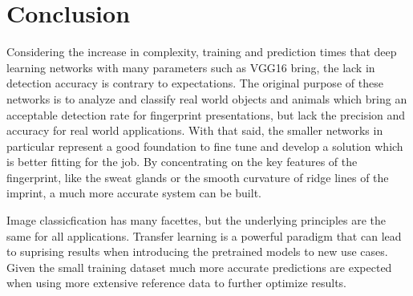 \section{Conclusion}
Considering the increase in complexity, training and prediction times that deep learning networks with many parameters such as VGG16 bring, the lack in detection accuracy is contrary to expectations.
The original purpose of these networks is to analyze and classify real world objects and animals which bring an acceptable detection rate for fingerprint presentations, but lack the precision and accuracy for real world applications.
With that said, the smaller networks in particular represent a good foundation to fine tune and develop a solution which is better fitting for the job.
By concentrating on the key features of the fingerprint, like the sweat glands or the smooth curvature of ridge lines of the imprint, a much more accurate system can be built.

Image classicfication has many facettes, but the underlying principles are the same for all applications.
Transfer learning is a powerful paradigm that can lead to suprising results when introducing the pretrained models to new use cases.
Given the small training dataset much more accurate predictions are expected when using more extensive reference data to further optimize results.

